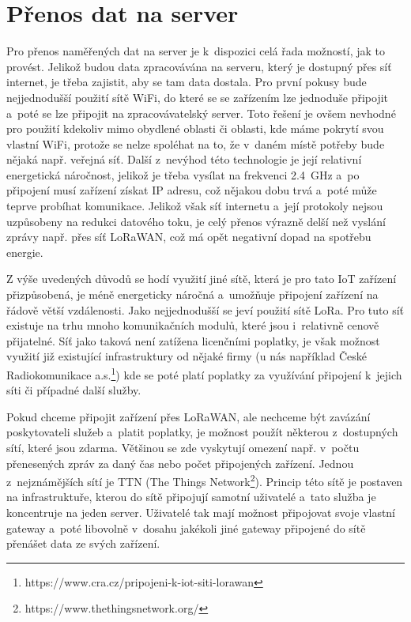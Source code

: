 \section{Přenos dat na server}

Pro přenos naměřených dat na server je k~dispozici celá řada možností, jak to provést. Jelikož budou data zpracovávána na serveru, který je dostupný přes síť internet, je třeba zajistit, aby se tam data dostala. Pro první pokusy bude nejjednodušší použití sítě WiFi, do které se se zařízením lze jednoduše připojit a~poté se lze připojit na zpracovávatelský server. Toto řešení je ovšem nevhodné pro použití kdekoliv mimo obydlené oblasti či oblasti, kde máme pokrytí svou vlastní WiFi, protože se nelze spoléhat na to, že v~daném místě potřeby bude nějaká např. veřejná síť. Další z~nevýhod této technologie je její relativní energetická náročnost, jelikož je třeba vysílat na frekvenci \SI{2,4}{\giga\hertz} a~po připojení musí zařízení získat IP adresu, což nějakou dobu trvá a~poté může teprve probíhat komunikace. Jelikož však síť internetu a~její protokoly nejsou uzpůsobeny na redukci datového toku, je celý přenos výrazně delší než vyslání zprávy např. přes síť LoRaWAN, což má opět negativní dopad na spotřebu energie.

Z výše uvedených důvodů se hodí využití jiné sítě, která je pro tato IoT zařízení přizpůsobená, je méně energeticky náročná a~umožňuje připojení zařízení na řádově větší vzdálenosti. Jako nejjednodušší se jeví použití sítě LoRa. Pro tuto síť existuje na trhu mnoho komunikačních modulů, které jsou i~relativně cenově přijatelné. Síť jako taková není zatížena licenčními poplatky, je však možnost využití již existující infrastruktury od nějaké firmy (u nás například České Radiokomunikace a.s.\footnote{https://www.cra.cz/pripojeni-k-iot-siti-lorawan}) kde se poté platí poplatky za využívání připojení k~jejich síti či případné další služby.

Pokud chceme připojit zařízení přes LoRaWAN, ale nechceme být zavázání poskytovateli služeb a~platit poplatky, je možnost použít některou z~dostupných sítí, které jsou zdarma. Většinou se zde vyskytují omezení např. v~počtu přenesených zpráv za daný čas nebo počet připojených zařízení. Jednou z~nejznámějších sítí je TTN (The Things Network\footnote{https://www.thethingsnetwork.org/}). Princip této sítě je postaven na infrastruktuře, kterou do sítě připojují samotní uživatelé a~tato služba je koncentruje na jeden server. Uživatelé tak mají možnost připojovat svoje vlastní gateway a~poté libovolně v~dosahu jakékoli jiné gateway připojené do sítě přenášet data ze svých zařízení.

